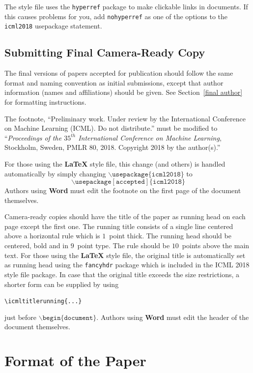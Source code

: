 \documentclass{article}
\begin{document}
The style file uses the \texttt{hyperref} package to make clickable
links in documents. If this causes problems for you, add
\texttt{nohyperref} as one of the options to the \texttt{icml2018}
usepackage statement.


\subsection{Submitting Final Camera-Ready Copy}

The final versions of papers accepted for publication should follow the
same format and naming convention as initial submissions, except that
author information (names and affiliations) should be given. See
Section~\ref{final author} for formatting instructions.

The footnote, ``Preliminary work. Under review by the International
Conference on Machine Learning (ICML). Do not distribute.'' must be
modified to ``\textit{Proceedings of the
$\mathit{35}^{th}$ International Conference on Machine Learning},
Stockholm, Sweden, PMLR 80, 2018.
Copyright 2018 by the author(s).''

For those using the \textbf{\LaTeX} style file, this change (and others) is
handled automatically by simply changing
$\mathtt{\backslash usepackage\{icml2018\}}$ to
$$\mathtt{\backslash usepackage[accepted]\{icml2018\}}$$
Authors using \textbf{Word} must edit the
footnote on the first page of the document themselves.

Camera-ready copies should have the title of the paper as running head
on each page except the first one. The running title consists of a
single line centered above a horizontal rule which is $1$~point thick.
The running head should be centered, bold and in $9$~point type. The
rule should be $10$~points above the main text. For those using the
\textbf{\LaTeX} style file, the original title is automatically set as running
head using the \texttt{fancyhdr} package which is included in the ICML
2018 style file package. In case that the original title exceeds the
size restrictions, a shorter form can be supplied by using

\verb|\icmltitlerunning{...}|

just before $\mathtt{\backslash begin\{document\}}$.
Authors using \textbf{Word} must edit the header of the document themselves.

\section{Format of the Paper}
\end{document}
